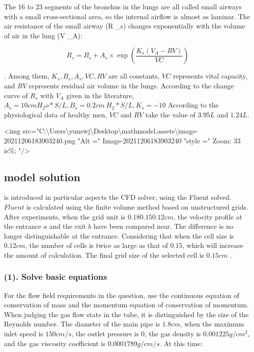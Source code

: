 \documentclass[
]{article}
\begin{document}
The 16 to 23 segments of the bronchus in the lungs are all called small
airways with a small cross-sectional area, so the internal airflow is
almost as laminar. The air resistance of the small airway (R \_s)
changes exponentially with the volume of air in the lung (V \_A):

\[R _s=B _s + A _s \times \exp(\frac{K _s(V _A-RV)}{VC })\]

. Among them, \(K _s, B _s, A _s, VC, RV\) are all constants, \(VC\)
represents vital capacity, and \(RV\) represents residual air volume in
the lungs. According to the change curve of \(R _s\) with \(V _A\) given
in the literature,
\(A _s = 10 cm H _2 o*S /L, B _s = 0.2cm~ H _2*S/L,K _s = -10\)
According to the physiological data of healthy men, \(VC\) and \(RV\)
take the value of \(3.95 L\) and \(1.24 L\).

\textless img
src="C:\textbackslash Users\textbackslash yunswj\textbackslash Desktop\textbackslash mathmodel.assets\textbackslash image-
20211206183903240.png "Alt =" Image-20211206183903240 "style =" Zoom: 33
is\%; "/\textgreater{}

\hypertarget{model-solution}{%
\subsection{\texorpdfstring{model solution
}{model solution }}\label{model-solution}}

is introduced in particular aspects the CFD solver, using the Fluent
solved. \(Fluent\) is calculated using the finite volume method based on
unstructured grids. After experiments, when the grid unit is
\(0.18 0.15 0.12cm\), the velocity profile at the entrance \(a\) and the
exit \(b\) have been compared near. The difference is no longer
distinguishable at the entrance. Considering that when the cell size is
\(0.12cm\), the number of cells is twice as large as that of \(0.15\),
which will increase the amount of calculation. The final grid size of
the selected cell is \( 0.15cm \) .

\hypertarget{1-solve-basic-equations}{%
\subsubsection{\texorpdfstring{(1). Solve basic equations
}{(1). Solve basic equations }}\label{1-solve-basic-equations}}

For the flow field requirements in the question, use the continuous
equation of conservation of mass and the momentum equation of
conservation of momentum. When judging the gas flow state in the tube,
it is distinguished by the size of the Reynolds number. The diameter of
the main pipe is \(1.8cm\), when the maximum inlet speed is \(150cm/s\),
the outlet pressure is 0, the gas density is \(0.001225g/cm^2\), and the
gas viscosity coefficient is \(0.0001789g/cm/s\). At this time:
\end{document}

